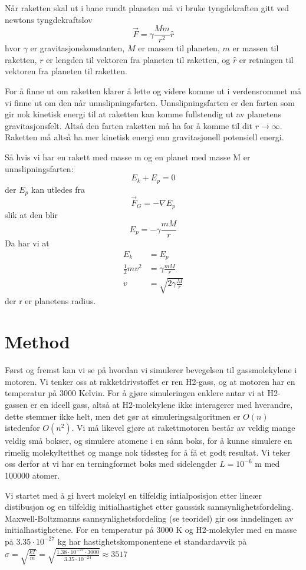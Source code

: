 \documentclass[reprint,english,notitlepage]{revtex4-1}
\begin{document}
	Når raketten skal ut i bane rundt planeten må vi bruke tyngdekraften gitt ved
	newtons tyngdekraftslov
	$$
		\vec{F} = \gamma\frac{Mm}{r^2}\hat{r}
	$$
	hvor $\gamma$ er gravitasjonskonstanten, $M$ er massen til planeten, $m$ er massen
	til raketten, $r$ er lengden til vektoren fra planeten til raketten, og $\hat{r}$ er
	retningen til vektoren fra planeten til raketten.

	For å finne ut om raketten klarer å lette og videre komme ut i verdensrommet må vi
	finne ut om den når unnslipningsfarten. Unnslipningsfarten er den farten
	som gir nok kinetisk energi til at raketten kan komme fullstendig ut av planetens gravitasjonsfelt.
	Altså den farten raketten må ha for å komme til dit $r\rightarrow\infty$.
	Raketten må altså ha mer kinetisk energi enn gravitasjonell potensiell energi.

	Så hvis vi har en rakett med masse m og en planet med masse M er unnslipningsfarten:
	$$
		E_k + E_p = 0
	$$
	der $E_p$ kan utledes fra
	$$
		\vec{F}_G = -\nabla E_p
  $$
	slik at den blir
	$$
		E_p = -\gamma \frac{mM}{r}
	$$
  Da har vi at
	\begin{align*}
		E_k &= E_p\\
		\frac{1}{2}mv^2 &= \gamma\frac{mM}{r}\\
    v&=\sqrt{2\gamma\frac{M}{r}}
	\end{align*}
	der r er planetens radius.


\section{Method}
  Først og fremst kan vi se på hvordan vi simulerer bevegelsen til gassmolekylene
	i motoren. Vi tenker oss at rakketdrivstoffet er ren H2-gass, og at motoren har
	en temperatur på $3000$ Kelvin. For å gjøre simuleringen enklere antar vi at H2-gassen
	er en ideell gass, altså at H2-molekylene ikke interagerer med hverandre, dette stemmer
	ikke helt, men det gør at simuleringsalgoritmen er $O(n)$ istedenfor $O(n^2)$. Vi
	må likevel gjøre at rakettmotoren består av veldig mange veldig små bokser, og
	simulere atomene i en sånn boks, for å kunne simulere en rimelig molekyltetthet
	og mange nok tidssteg for å få et godt resultat. Vi teker oss derfor at
	vi har en terningformet boks med sidelengder $L = 10^{-6}$ m med 100000 atomer. \

	Vi startet med å gi hvert molekyl en tilfeldig intialposisjon etter
	lineær distibusjon og en tilfeldig initialhastighet etter gaussisk
	sannsynlighetsfordeling. Maxwell-Boltzmanns sannsynlighetsfordeling (se teoridel) gir oss
	inndelingen av initialhastighetene. For en temperatur på $3000$ K og H2-molekyler
	med en masse på $3.35 \cdot 10^{-27}$ kg har hastighetskomponentene et standardavvik
	på $\sigma = \sqrt{\frac{kT}{m}} = \sqrt{\frac{1.38 \cdot 10^{-27} \cdot 3000}{3.35 \cdot 10^{-24}}} \approx 3517$ \
\end{document}
